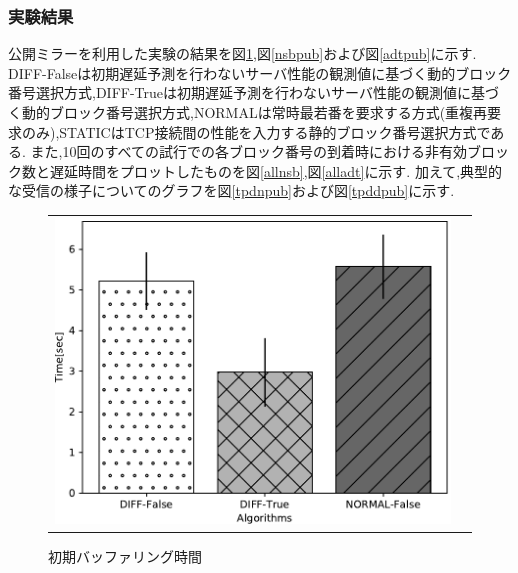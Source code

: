\documentclass[a4j,12pt]{gradthesis_utf8}
\begin{document}
\subsubsection{実験結果}
公開ミラーを利用した実験の結果を図\ref{ibtpub},図\ref{nsbpub}および図\ref{adtpub}に示す.
DIFF-Falseは初期遅延予測を行わないサーバ性能の観測値に基づく動的ブロック番号選択方式,DIFF-Trueは初期遅延予測を行わないサーバ性能の観測値に基づく動的ブロック番号選択方式,NORMALは常時最若番を要求する方式(重複再要求のみ),STATICはTCP接続間の性能を入力する静的ブロック番号選択方式である.
また,10回のすべての試行での各ブロック番号の到着時における非有効ブロック数と遅延時間をプロットしたものを図\ref{allnsb},図\ref{alladt}に示す.
加えて,典型的な受信の様子についてのグラフを図\ref{tpdnpub}および図\ref{tpddpub}に示す.
\begin{figure}[h]
    \begin{tabular}{cc}
       	\begin{minipage}[t]{0.9\hsize}
       		\centering
       		\includegraphics[width=13cm]{figure/InitialBufferingTimePub.pdf}
       		\caption{初期バッファリング時間}
       		\label{ibtpub}
       	\end{minipage}
    \end{tabular}
\end{figure}
\end{document}
